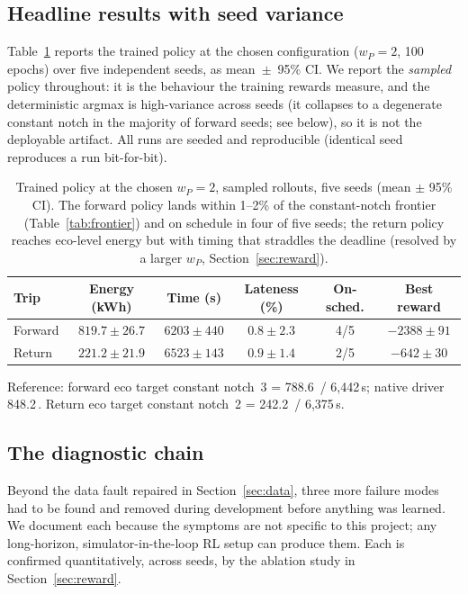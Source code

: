 \documentclass[11pt,a4paper]{article}
\newcommand{\kwh}{\,\text{kWh}}   %
\begin{document}
\subsection{Headline results with seed variance}

Table~\ref{tab:headline} reports the trained policy at the chosen
configuration ($w_P=2$, 100 epochs) over five independent seeds, as
mean~$\pm$~95\% CI. We report the \emph{sampled} policy throughout: it is
the behaviour the training rewards measure, and the deterministic argmax is
high-variance across seeds (it collapses to a degenerate constant notch in
the majority of forward seeds; see below), so it is not the deployable
artifact. All runs are seeded and reproducible (identical seed reproduces a
run bit-for-bit).

\begin{table}[t]
\centering\small
\begin{threeparttable}
\caption{Trained policy at the chosen $w_P=2$, sampled rollouts, five seeds
(mean $\pm$ 95\% CI). The forward policy lands within 1--2\% of the
constant-notch frontier (Table~\ref{tab:frontier}) and on schedule in four
of five seeds; the return policy reaches eco-level energy but with timing
that straddles the deadline (resolved by a larger $w_P$,
Section~\ref{sec:reward}).}
\label{tab:headline}
\begin{tabular}{lccccc}
\toprule
Trip & Energy (kWh) & Time (s) & Lateness (\%) & On-sched. & Best reward \\
\midrule
Forward & $819.7\pm26.7$ & $6203\pm440$ & $0.8\pm2.3$ & 4/5 & $-2388\pm91$ \\
Return  & $221.2\pm21.9$ & $6523\pm143$ & $0.9\pm1.4$ & 2/5 & $-642\pm30$ \\
\bottomrule
\end{tabular}
\begin{tablenotes}\footnotesize
\item Reference: forward eco target constant notch~3 = 788.6\kwh{} /
6{,}442\,s; native driver 848.2\kwh. Return eco target constant notch~2 =
242.2\kwh{} / 6{,}375\,s.
\end{tablenotes}
\end{threeparttable}
\end{table}

\subsection{The diagnostic chain}

Beyond the data fault repaired in Section~\ref{sec:data}, three more failure
modes had to be found and removed during development before anything was
learned. We document each because the symptoms are not specific to this
project; any long-horizon, simulator-in-the-loop RL setup can produce them.
Each is confirmed quantitatively, across seeds, by the ablation study in
Section~\ref{sec:reward}.
\end{document}
